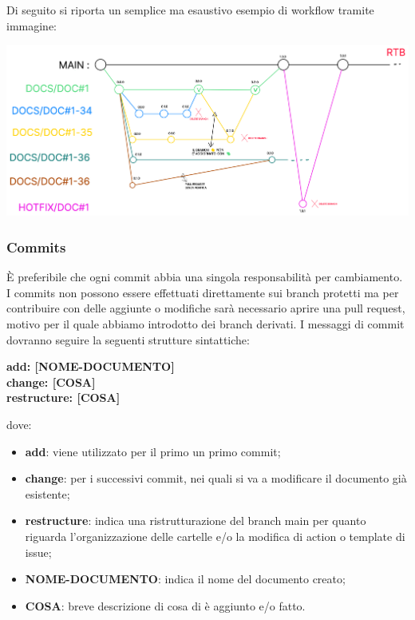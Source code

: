         Di seguito si riporta un semplice ma esaustivo esempio di workflow tramite immagine:
        \begin{center}
            \includegraphics[scale = 0.33]{template/images/workflow.png}
        \end{center}

        \subsubsection{Commits}\label{inf:comm}
        È preferibile che ogni commit abbia una singola responsabilità per cambiamento.
        I commits non possono essere effettuati direttamente sui branch protetti ma per contribuire con delle aggiunte o
        modifiche sarà necessario aprire una pull request, motivo per il quale abbiamo introdotto dei branch derivati.
        I messaggi di commit dovranno seguire la seguenti strutture sintattiche:
        \begin{center}
            \textbf{add: [NOME-DOCUMENTO]\\
            change: [COSA]\\
            restructure: [COSA]}
        \end{center}
        dove: 
        \begin{itemize}
            \item \textbf{add}: viene utilizzato per il primo un primo commit;
            \item \textbf{change}: per i successivi commit, nei quali si va a modificare il documento già esistente;
            \item \textbf{restructure}: indica una ristrutturazione del branch main per quanto riguarda l'organizzazione delle cartelle e/o la modifica di action o template di issue;
            \item \textbf{NOME-DOCUMENTO}: indica il nome del documento creato;
            \item \textbf{COSA}: breve descrizione di cosa di è aggiunto e/o fatto.
        \end{itemize}

